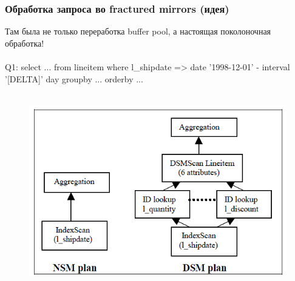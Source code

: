 \documentclass{beamer}
\begin{document}
\begin{frame}

\end{frame}

\begin{frame}
\frametitle{Обработка запроса во fractured mirrors (идея)}

Там была не только переработка buffer pool, а настоящая поколоночная обработка!
\\~\\
Q1: select ... from lineitem where l\_shipdate => date '1998-12-01' - interval '[DELTA]' day groupby ... orderby ...\\~\\

\begin{figure}[htb]
\includegraphics[width=\textwidth,height=0.50\textheight,keepaspectratio]{fractured-2.png}
 \end{figure}    

\end{frame}
\end{document}
